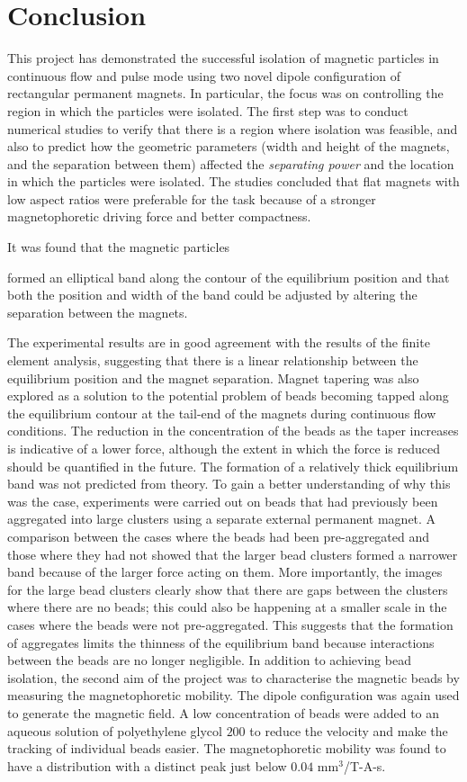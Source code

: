\chapter{Conclusion}\label{ch:conclusion}

This project has demonstrated the successful isolation of magnetic particles in continuous flow and pulse mode using two novel dipole configuration of rectangular permanent magnets. In particular, the focus was on controlling the region in which the particles were isolated. The first step was to conduct numerical studies to verify that there is a region where isolation was feasible, and also to predict how the geometric parameters (width and height of the magnets, and the separation between them) affected the \textit{separating power} and the location in which the particles were isolated. The studies concluded that flat magnets with low aspect ratios were preferable for the task because of a stronger magnetophoretic driving force and better compactness.

It was found that the magnetic particles 

formed an elliptical band along the contour of the equilibrium position and that both the position and width of the band could be adjusted by altering the separation between the magnets. 


The experimental results are in good agreement with the results of the finite element analysis, suggesting that there is a linear relationship between the equilibrium position and the magnet separation. Magnet tapering was also explored as a solution to the potential problem of beads becoming tapped along the equilibrium contour at the tail-end of the magnets during continuous flow conditions. The reduction in the concentration of the beads as the taper increases is indicative of a lower force, although the extent in which the force is reduced should be quantified in the future. The formation of a relatively thick equilibrium band was not predicted from theory. To gain a better understanding of why this was the case, experiments were carried out on beads that had previously been aggregated into large clusters using a separate external permanent magnet. A comparison between the cases where the beads had been pre-aggregated and those where they had not showed that the larger bead clusters formed a narrower band because of the larger force acting on them. More importantly, the images for the large bead clusters clearly show that there are gaps between the clusters where there are no beads; this could also be happening at a smaller scale in the cases where the beads were not pre-aggregated. This suggests that the formation of aggregates limits the thinness of the equilibrium band because interactions between the beads are no longer negligible. In addition to achieving bead isolation, the second aim of the project was to characterise the magnetic beads by measuring the magnetophoretic mobility. The dipole configuration was again used to generate the magnetic field. A low concentration of beads were added to an aqueous solution of polyethylene glycol $200$ to reduce the velocity and make the tracking of individual beads easier. The magnetophoretic mobility was found to have a distribution with a distinct peak just below $0.04$ mm$^3$/T-A-s.

